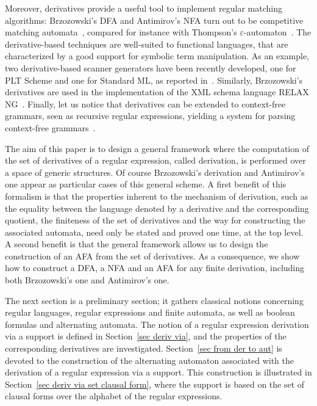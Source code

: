 \documentclass{article}
\begin{document}
Moreover, derivatives provide a useful tool to implement regular matching algorithms:
Brzozowski's DFA and Antimirov's NFA turn out to be 
competitive matching automata~\cite{SL07},
compared for instance with Thompson's $\varepsilon$-automaton~\cite{Tho68}.
The derivative-based techniques are well-suited to functional languages,
that are characterized by a good support for symbolic term manipulation.
As an example, two derivative-based scanner generators have been recently developed,
one for PLT Scheme and one for Standard ML, as reported in~\cite{ORT09}.
Similarly, Brzozowski's derivatives are used in the implementation of the XML schema language RELAX NG~\cite{Cla02}.
Finally, let us notice that derivatives can be extended to context-free grammars, seen as recursive regular expressions,
yielding a system for parsing context-free grammars~\cite{MDS11}.


The aim of this paper is to design a general 
framework
where the computation of the set of derivatives of a regular expression, called derivation, is performed over a space of generic structures.
Of course Brzozowski's derivation and Antimirov's one appear as particular cases of this general scheme.
A first benefit of this formalism is that the properties inherent to the mechanism of derivation, such as 
the equality between the language denoted by a derivative and the corresponding quotient,
the finiteness of the set of derivatives
and the way for constructing the associated automata,
need only be stated and proved one time, at the top level. 
A second benefit is that the general 
framework
allows us to design the construction of an AFA from the set of derivatives.
As a consequence, we show how to construct a DFA, a NFA and an AFA for any finite derivation, including both Brzozowski's one and Antimirov's one.

The next section is a preliminary section; it gathers classical notions concerning 
regular languages, regular expressions and finite automata, as well as boolean formulas and alternating automata.
The notion of a regular expression derivation via a support is defined in Section~\ref{sec deriv via},
and the properties of the corresponding derivatives are investigated. 
Section~\ref{sec from der to aut} is devoted to the construction of the alternating automaton
associated with the derivation of a regular expression via a support.
This construction is illustrated in Section~\ref{sec deriv via set clausal form},
where the support is based on the set of clausal forms over the alphabet of the regular expressions.
\end{document}
